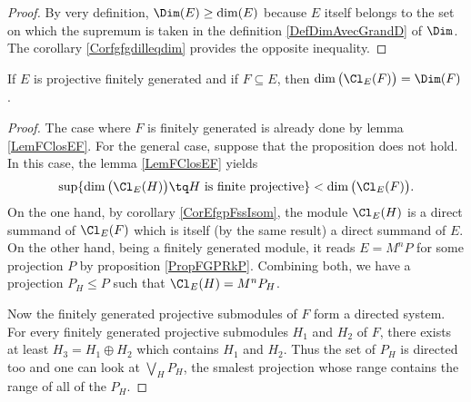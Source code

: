 \begin{proof}
By very definition, $\Dim(E)\geq\dim(E)$ because $E$ itself belongs to the set on which the supremum is taken in the definition \eqref{DefDimAvecGrandD} of $\Dim$. The corollary \ref{Corfgfgdilleqdim} provides the opposite inequality.
\end{proof}

\begin{proposition}		\label{PropProjFiniDimCldim}
If $E$ is projective finitely generated and if $F\subseteq E$, then $\dim\big( \Cl_E(F) \big)=\Dim(F)$.
\end{proposition}

\begin{proof}
The case where $F$ is finitely generated is already done by lemma \ref{LemFClosEF}. For the general case, suppose that the proposition does not hold. In this case, the lemma \ref{LemFClosEF} yields
\begin{equation}
	\sup\{ \dim\big( \Cl_E(H) \big)\tq \text{$H$ is finite projective} \}<\dim\big( \Cl_E(F) \big).
\end{equation}
On the one hand, by corollary \ref{CorEfgpFssIsom}, the module $\Cl_E(H)$ is a direct summand of $\Cl_E(F)$ which is itself (by the same result) a direct summand of $E$. On the other hand, being a finitely generated module, it reads $E=M^nP$ for some projection $P$ by proposition \ref{PropFGPRkP}. Combining both, we have a projection $P_H\leq P$ such that $\Cl_E(H)=M^nP_H$.

Now the finitely generated projective submodules of $F$ form a directed system. For every finitely generated projective submodules $H_1$ and $H_2$ of $F$, there exists at least $H_3=H_1\oplus H_2$ which contains $H_1$ and $H_2$. Thus the set of $P_H$ is directed too and one can look at $\bigvee_HP_H$, the smalest projection whose range contains the range of all of the $P_H$.


\end{proof}
